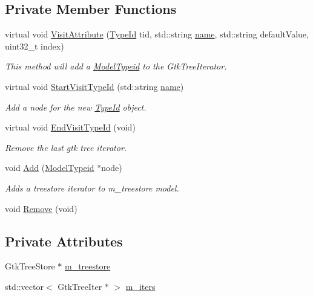 \subsection*{Private Member Functions}
\begin{DoxyCompactItemize}
\item 
virtual void \hyperlink{classns3_1_1ModelTypeidCreator_af0ede4f2ab9803653302625bf522d150}{Visit\+Attribute} (\hyperlink{classns3_1_1TypeId}{Type\+Id} tid, std\+::string \hyperlink{generate__test__data__lte__spectrum__model_8m_ab74e6bf80237ddc4109968cedc58c151}{name}, std\+::string default\+Value, uint32\+\_\+t index)
\begin{DoxyCompactList}\small\item\em This method will add a \hyperlink{structns3_1_1ModelTypeid}{Model\+Typeid} to the Gtk\+Tree\+Iterator. \end{DoxyCompactList}\item 
virtual void \hyperlink{classns3_1_1ModelTypeidCreator_ab332a64520c6559fe634888e8772ac92}{Start\+Visit\+Type\+Id} (std\+::string \hyperlink{generate__test__data__lte__spectrum__model_8m_ab74e6bf80237ddc4109968cedc58c151}{name})
\begin{DoxyCompactList}\small\item\em Add a node for the new \hyperlink{classns3_1_1TypeId}{Type\+Id} object. \end{DoxyCompactList}\item 
virtual void \hyperlink{classns3_1_1ModelTypeidCreator_ae4364ba8b23673c42543af0640b6da80}{End\+Visit\+Type\+Id} (void)
\begin{DoxyCompactList}\small\item\em Remove the last gtk tree iterator. \end{DoxyCompactList}\item 
void \hyperlink{classns3_1_1ModelTypeidCreator_a997938b7ffb67a1876d9ff78be582cbf}{Add} (\hyperlink{structns3_1_1ModelTypeid}{Model\+Typeid} $\ast$node)
\begin{DoxyCompactList}\small\item\em Adds a treestore iterator to m\+\_\+treestore model. \end{DoxyCompactList}\item 
void \hyperlink{classns3_1_1ModelTypeidCreator_aad7cb7c2c9bef1781b3f9485dfc1d027}{Remove} (void)
\end{DoxyCompactItemize}
\subsection*{Private Attributes}
\begin{DoxyCompactItemize}
\item 
Gtk\+Tree\+Store $\ast$ \hyperlink{classns3_1_1ModelTypeidCreator_aaf4807a0da7307b076b642f5f55c1609}{m\+\_\+treestore}
\item 
std\+::vector$<$ Gtk\+Tree\+Iter $\ast$ $>$ \hyperlink{classns3_1_1ModelTypeidCreator_af4da6d8d1af7cc93c12fff92cddd4db1}{m\+\_\+iters}
\end{DoxyCompactItemize}


